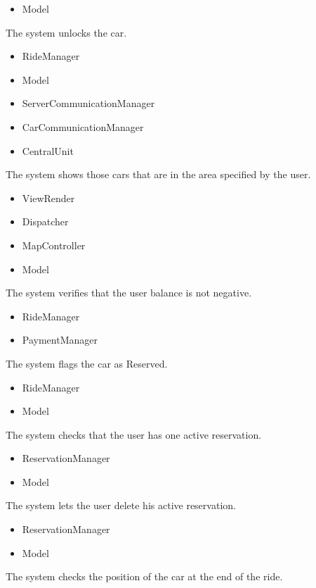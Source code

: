 \documentclass[11pt,a4paper]{report}
\begin{document}
\begin{Req}
\begin{itemize}
				\item Model
			\end{itemize}
		\item The system unlocks the car.
			\begin{itemize}
				\item RideManager
				\item Model
				\item ServerCommunicationManager
				\item CarCommunicationManager
				\item CentralUnit
			\end{itemize}
		\item The system shows those cars that are in the area specified by the user.
			\begin{itemize}
				\item ViewRender
				\item Dispatcher
				\item MapController
				\item Model
			\end{itemize}
		\item The system verifies that the user balance is not negative.
			\begin{itemize}
				\item RideManager
				\item PaymentManager
			\end{itemize}
		\item The system flags the car as Reserved.
			\begin{itemize}
				\item RideManager
				\item Model
			\end{itemize}
		\item The system checks that the user has one active reservation.
			\begin{itemize}
				\item ReservationManager
				\item Model
			\end{itemize}
		\item The system lets the user delete his active reservation.
			\begin{itemize}
				\item ReservationManager
				\item Model
			\end{itemize}
		\item The system checks the position of the car at the end of the ride.
			\begin{itemize}

\end{itemize}
\end{Req}
\end{document}
